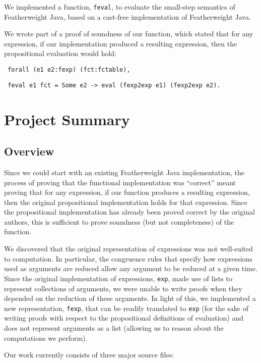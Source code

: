 \documentclass{article}
\begin{document}
We implemented a function, \texttt{feval}, to evaluate the small-step semantics of Featherweight Java, based on a cast-free implementation of Featherweight Java\cite{castfree}.

We wrote part of a proof of soundness of our function, which stated that for any expression, if our implementation produced a resulting expression, then the propositional evaluation would hold:

\texttt{
forall (e1 e2:fexp) (fct:fctable),
}

\texttt{
    feval e1 fct = Some e2 -> eval (fexp2exp e1) (fexp2exp e2).
}

\section{Project Summary}

\subsection{Overview}

Since we could start with an existing Featherweight Java implementation, the process of proving that the functional implementation was ``correct'' meant proving that for any expression, if our function produces a resulting expression, then the original propositional implementation holds for that expression.  Since the propositional implementation has already been proved correct by the original authors, this is sufficient to prove soundness (but not completeness) of the function.

We discovered that the original representation of expressions was not well-suited to computation. In particular, the congruence rules that specify how expressions used as arguments are reduced allow any argument to be reduced at a given time. Since the original implementation of expressions, \texttt{exp}, made use of lists to represent collections of arguments, we were unable to write proofs when they depended on the reduction of these arguments. In light of this, we implemented a new representation, \texttt{fexp}, that can be readily translated to \texttt{exp} (for the sake of writing proofs with respect to the propositional definitions of evaluation) and does not represent arguments as a list (allowing us to reason about the computations we perform).

Our work currently consists of three major source files:
\end{document}
